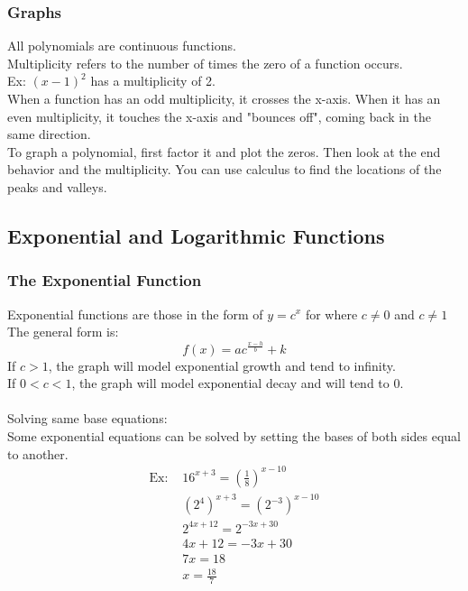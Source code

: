 \documentclass[11pt, fleqn]{article}
\begin{document}
\subsubsection{Graphs}
All polynomials are continuous functions.\\
Multiplicity refers to the number of times the zero of a function occurs.\\
Ex: $(x-1)^2$ has a multiplicity of 2.\\
When a function has an odd multiplicity, it crosses the x-axis. When it has an even multiplicity, it touches the x-axis and "bounces off", coming back in the same direction.\\
To graph a polynomial, first factor it and plot the zeros. Then look at the end behavior and the multiplicity. You can use calculus to find the locations of the peaks and valleys.








\subsection{Exponential and Logarithmic Functions}

\subsubsection{The Exponential Function}
Exponential functions are those in the form of $y=c^x$ for where $c\neq0$ and $c\neq 1$\\
The general form is:
$$f(x)=ac^{\frac{x-h}{b}}+k$$
If $c>1$, the graph will model exponential growth and tend to infinity.\\
If $0<c<1$, the graph will model exponential decay and will tend to 0.\\
\\
Solving same base equations:\\
Some exponential equations can be solved by setting the bases of both sides equal to another.\\
\begin{align*}
    \text{Ex: }&16^{x+3}=\left(\frac{1}{8}\right)^{x-10}\\
    &(2^4)^{x+3}=(2^{-3})^{x-10}\\
    &2^{4x+12}=2^{-3x+30}\\
    &4x+12=-3x+30\\
    &7x=18\\
    &x=\frac{18}{7}
\end{align*}
\end{document}
